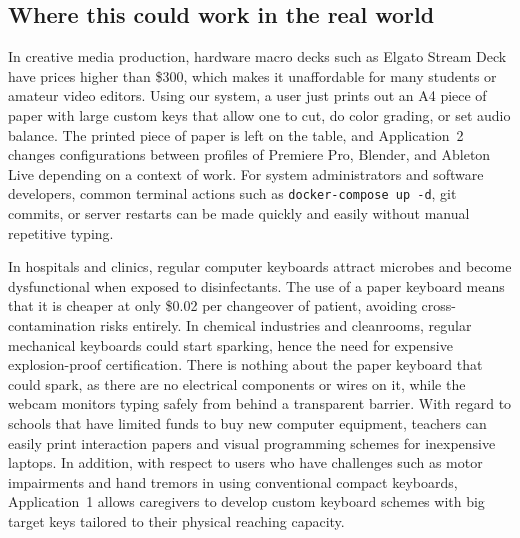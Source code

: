 \subsection{Where this could work in the real world}
\label{subsec:concl_applications}
In creative media production, hardware macro decks such as Elgato Stream Deck have prices higher than \$300, which makes it unaffordable for many students or amateur video editors. Using our system, a user just prints out an A4 piece of paper with large custom keys that allow one to cut, do color grading, or set audio balance. The printed piece of paper is left on the table, and Application~2 changes configurations between profiles of Premiere Pro, Blender, and Ableton Live depending on a context of work. For system administrators and software developers, common terminal actions such as \texttt{docker-compose up -d}, git commits, or server restarts can be made quickly and easily without manual repetitive typing.

In hospitals and clinics, regular computer keyboards attract microbes and become dysfunctional when exposed to disinfectants. The use of a paper keyboard means that it is cheaper at only \$0.02 per changeover of patient, avoiding cross-contamination risks entirely. In chemical industries and cleanrooms, regular mechanical keyboards could start sparking, hence the need for expensive explosion-proof certification. There is nothing about the paper keyboard that could spark, as there are no electrical components or wires on it, while the webcam monitors typing safely from behind a transparent barrier. With regard to schools that have limited funds to buy new computer equipment, teachers can easily print interaction papers and visual programming schemes for inexpensive laptops. In addition, with respect to users who have challenges such as motor impairments and hand tremors in using conventional compact keyboards, Application~1 allows caregivers to develop custom keyboard schemes with big target keys tailored to their physical reaching capacity.

